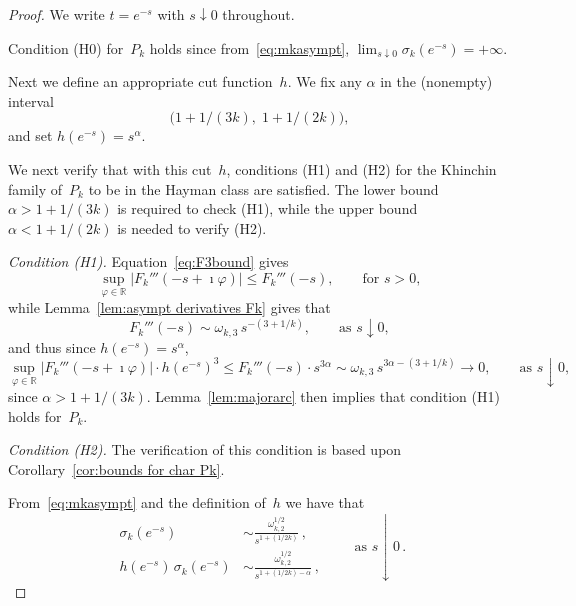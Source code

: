 \documentclass[10pt,a4paper]{amsart}
\begin{document}
\begin{proof}
We write $t=e^{-s}$ with $s\downarrow 0$ throughout.

Condition (H0) for~$P_k$ holds since from~\eqref{eq:mkasympt}, $\lim_{s\downarrow 0}\sigma_k(e^{-s})=+\infty$.

Next we define an appropriate cut function~$h$. We fix any $\alpha$ in the (nonempty) interval
\begin{equation}\label{eq:alphainterval}
\big(1+1/(3k),\; 1+1/(2k)\big),
\end{equation}
and set $h(e^{-s})=s^{\alpha}$.
\smallskip

We next verify that with this cut~$h$, conditions (H1) and (H2) for the Khinchin family
of~$P_k$ to be in the Hayman class are satisfied. The lower bound  $\alpha > 1+1/(3k)$ is required
to check (H1), while the upper bound  $\alpha < 1+1/(2k)$ is needed to verify (H2).

\medskip

\noindent\textit{Condition \textup{(H1)}.} Equation~\eqref{eq:F3bound} gives
\begin{equation}\label{eq:F3boundbis}
\sup_{\varphi\in\mathbb{R}} \big|F_k'''(-s+\imath\varphi)\big| \le F_k'''(-s), \qquad \text{for } s>0,
\end{equation}
while Lemma~\ref{lem:asympt derivatives Fk} gives that
\[
F_k'''(-s) \sim \omega_{k,3}\, s^{-(3+1/k)}, \qquad \text{as } s\downarrow 0,
\]
and thus since $h(e^{-s})=s^{\alpha}$,
\begin{equation}\label{eq:F3boundtris}
\sup_{\varphi\in\mathbb{R}} \big|F_k'''(-s+\imath\varphi)\big| \cdot h(e^{-s})^3 \le F_k'''(-s)\cdot s^{3\alpha} \sim \omega_{k,3}\, s^{3\alpha-(3+1/k)} \to 0, \qquad \text{as } s\downarrow 0,
\end{equation}
since $\alpha > 1+1/(3k)$. Lemma~\ref{lem:majorarc} then implies that condition (H1) holds for~$P_k$.

\medskip

\noindent\textit{Condition \textup{(H2)}.} The verification of this condition is based upon Corollary~\ref{cor:bounds for char Pk}.

From~\eqref{eq:mkasympt} and the definition of~$h$ we have that
\begin{equation}\label{eq:sigmahasympt}
\begin{aligned}
\sigma_k(e^{-s}) &\sim \frac{\omega_{k,2}^{1/2}}{s^{1+(1/2k)}}\,,\\[4pt]
h(e^{-s})\,\sigma_k(e^{-s}) &\sim \frac{\omega_{k,2}^{1/2}}{s^{1+(1/2k)-\alpha}}\,,
\end{aligned}
\qquad \text{as } s\downarrow 0\,.
\end{equation}


\end{proof}
\end{document}
